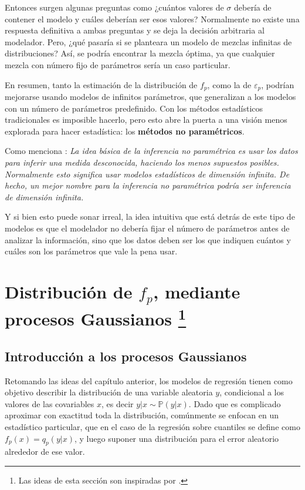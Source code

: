 Entonces surgen algunas preguntas como ¿cu\'antos valores de $\sigma$ deber\'ia de contener el modelo y cu\'ales deber\'ian ser esos valores? Normalmente no existe una respuesta definitiva a ambas preguntas y se deja la decisi\'on arbitraria al modelador. Pero, ¿qu\'e pasar\'ia si se planteara un modelo de mezclas infinitas de distribuciones? As\'i, se podr\'ia encontrar la mezcla \'optima, ya que cualquier mezcla con n\'umero fijo de par\'ametros ser\'ia un caso particular.

En resumen, tanto la estimaci\'on de la distribuci\'on de $f_p$, como la de $\varepsilon_p$, podr\'ian mejorarse usando modelos de infinitos par\'ametros, que generalizan a los modelos con un n\'umero de par\'ametros predefinido. Con los m\'etodos estad\'isticos tradicionales es imposible hacerlo, pero esto abre la puerta a una visi\'on menos explorada para hacer estad\'istica: los \textbf{m\'etodos no param\'etricos}.

Como menciona \cite{Wasserman_Nonparametric}: \textit{La idea b\'asica de la inferencia no param\'etrica es usar los datos para inferir una medida desconocida, haciendo los menos supuestos posibles. Normalmente esto significa usar modelos estad\'isticos de dimensi\'on infinita. De hecho, un mejor nombre para la inferencia no param\'etrica podr\'ia ser inferencia de dimensi\'on infinita.}

Y si bien esto puede sonar irreal, la idea intuitiva que est\'a detr\'as de este tipo de modelos es que el modelador no deber\'ia fijar el n\'umero de par\'ametros antes de analizar la informaci\'on, sino que los datos deben ser los que indiquen cu\'antos y cu\'ales son los par\'ametros que vale la pena usar.

\section[Distribuci\'on de $f_p$, mediante procesos Gaussianos]{
    Distribuci\'on de $f_p$, mediante procesos Gaussianos
    \footnote{Las ideas de esta secci\'on son inspiradas por \cite{Rasmussen_GauProc}.}
}

\subsection{Introducci\'on a los procesos Gaussianos}

Retomando las ideas del cap\'itulo anterior, los modelos de regresi\'on tienen como objetivo describir la distribuci\'on de una variable aleatoria $y$, condicional a los valores de las covariables $x$, es decir $y|x \sim \mathbb{P}(y|x)$. Dado que es complicado aproximar con exactitud toda la distribuci\'on, com\'unmente se enfocan en un estad\'istico particular, que en el caso de la regresi\'on sobre cuantiles se define como $f_p(x) = q_p(y|x)$, y luego suponer una distribuci\'on para el error aleatorio alrededor de ese valor.

